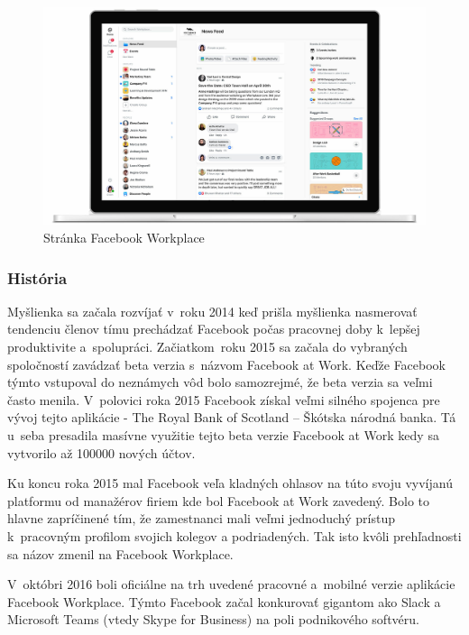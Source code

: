 \begin{figure}[H]
    \centering
    \includegraphics[scale=0.25]{img/obr-fb-workplace.jpg}
    \caption{Stránka Facebook Workplace}
    \label{fig:img-fb-workplace}
\end{figure}

\subsubsection{História}
\indent Myšlienka sa začala rozvíjať v roku 2014 keď prišla myšlienka nasmerovať tendenciu členov tímu prechádzať Facebook počas pracovnej doby k lepšej produktivite a spolupráci. Začiatkom roku 2015 sa začala do vybraných spoločností zavádzať beta verzia s názvom Facebook at Work. Keďže Facebook týmto vstupoval do neznámych vôd bolo samozrejmé, že beta verzia sa veľmi často menila. V polovici roka 2015 Facebook získal veľmi silného spojenca pre vývoj tejto aplikácie - The Royal Bank of Scotland – Škótska národná banka. Tá u seba presadila masívne využitie tejto beta verzie Facebook at Work kedy sa vytvorilo až 100000 nových účtov. 

\indent Ku koncu roka 2015 mal Facebook veľa kladných ohlasov na túto svoju vyvíjanú platformu od manažérov firiem kde bol Facebook at Work zavedený. Bolo to hlavne zapríčinené tím, že zamestnanci mali veľmi jednoduchý prístup k pracovným profilom svojich kolegov a podriadených. Tak isto kvôli prehľadnosti sa názov zmenil na Facebook Workplace.

\indent  V októbri 2016 boli oficiálne na trh uvedené pracovné a mobilné verzie aplikácie Facebook Workplace. Týmto Facebook začal konkurovať gigantom ako Slack a Microsoft Teams (vtedy Skype for Business) na poli podnikového softvéru.

